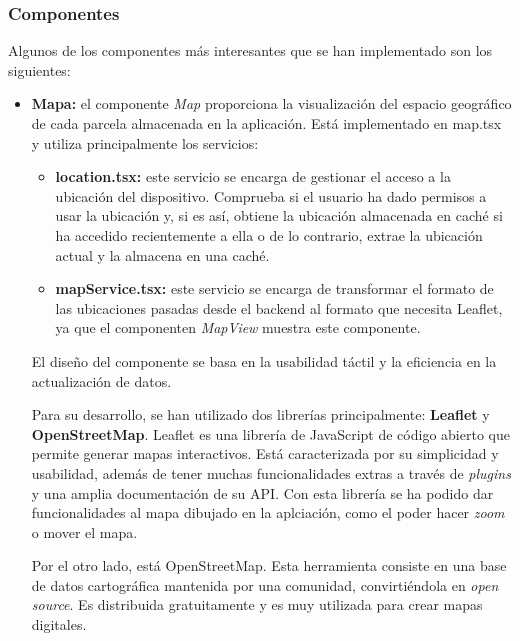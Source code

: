 \subsubsection{Componentes}

Algunos de los componentes más interesantes que se han implementado son los siguientes:

\begin{itemize}
    \item \textbf{Mapa:} el componente \textit{Map} proporciona la visualización del espacio geográfico de cada parcela almacenada en la aplicación. Está implementado en map.tsx y utiliza principalmente los servicios:
    
    \begin{itemize}
        \item \textbf{location.tsx:} este servicio se encarga de gestionar el acceso a la ubicación del dispositivo. Comprueba si el usuario ha dado permisos a usar la ubicación y, si es así, obtiene la ubicación almacenada
        en caché si ha accedido recientemente a ella o de lo contrario, extrae la ubicación actual y la almacena en una caché.

        \item \textbf{mapService.tsx:} este servicio se encarga de transformar el formato de las ubicaciones pasadas desde el backend al formato que necesita Leaflet, ya que el componenten \textit{MapView} muestra este componente.
    \end{itemize}
    
    El diseño del componente se basa en la usabilidad táctil y la eficiencia en la actualización de datos. 

    Para su desarrollo, se han utilizado dos librerías principalmente: \textbf{Leaflet} y \textbf{OpenStreetMap}. Leaflet es una librería de JavaScript de código abierto que permite generar mapas interactivos. Está caracterizada
    por su simplicidad y usabilidad, además de tener muchas funcionalidades extras a través de \textit{plugins} y una amplia documentación de su API. Con esta librería se ha podido dar funcionalidades al mapa dibujado en la aplciación,
    como el poder hacer \textit{zoom} o mover el mapa.

    Por el otro lado, está OpenStreetMap. Esta herramienta \cite{openStreetMap} consiste en una base de datos cartográfica mantenida por una comunidad, convirtiéndola en \textit{open source}. Es distribuida gratuitamente y es muy utilizada
    para crear mapas digitales. 


\end{itemize}

